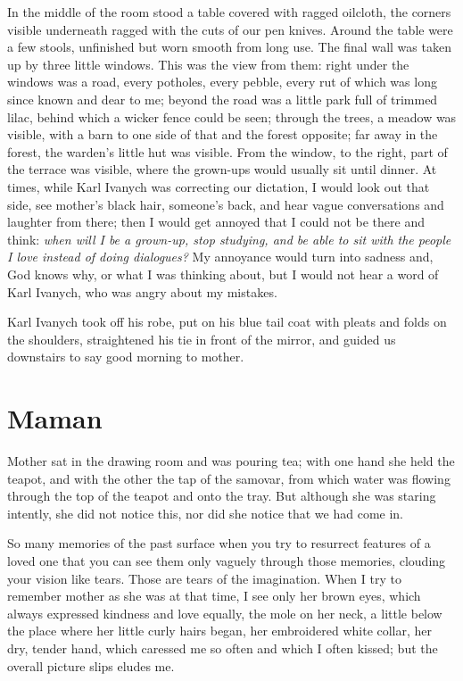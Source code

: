 In the middle of the room stood a table covered with ragged oilcloth, the corners visible underneath ragged with the cuts of our pen knives. Around the table were a few stools, unfinished but worn smooth from long use. The final wall was taken up by three little windows. This was the view from them: right under the windows was a road, every potholes, every pebble, every rut of which was long since known and dear to me; beyond the road was a little park full of trimmed lilac, behind which a wicker fence could be seen; through the trees, a meadow was visible, with a barn to one side of that and the forest opposite; far away in the forest, the warden's little hut was visible. From the window, to the right, part of the terrace was visible, where the grown-ups would usually sit until dinner. At times, while Karl Ivanych was correcting our dictation, I would look out that side, see mother's black hair, someone's back, and hear vague conversations and laughter from there; then I would get annoyed that I could not be there and think: \textit{when will I be a grown-up, stop studying, and be able to sit with the people I love instead of doing dialogues?} My annoyance would turn into sadness and, God knows why, or what I was thinking about, but I would not hear a word of Karl Ivanych, who was angry about my mistakes. %

Karl Ivanych took off his robe, put on his blue tail coat with pleats and folds  on the shoulders, straightened his tie in front of the mirror, and guided us downstairs to say good morning to mother.

\chapter{Maman}

Mother sat in the drawing room and was pouring tea; with one hand she held the teapot, and with the other the tap of the samovar, from which water was flowing through the top of the teapot and onto the tray. But although she was staring intently, she did not notice this, nor did she notice that we had come in.

So many memories of the past surface when you try to resurrect features of a loved one that you can see them only vaguely through those memories, clouding your vision like tears. Those are tears of the imagination. When I try to remember mother as she was at that time, I see only her brown eyes, which always expressed kindness and love equally, the mole on her neck, a little below the place where her little curly hairs began, her embroidered white collar, her dry, tender hand, which caressed me so often and which I often kissed; but the overall picture slips eludes me.

